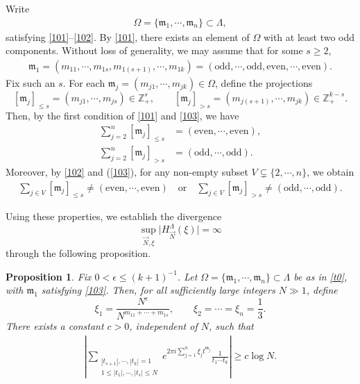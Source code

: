 \documentclass[11 pt,letterpaper]{amsart}
\theoremstyle{plain}
\newtheorem{proposition}{Proposition}\numberwithin{proposition}{section}
\theoremstyle{definition}
\theoremstyle{remark} \theoremstyle{exam} \theoremstyle{ob}
\numberwithin{equation}{section}
\begin{document}
Write
\begin{align}\label{t0}
\Omega=\{\mathfrak{m}_1,\cdots,\mathfrak{m}_n\}\subset \Lambda,
\end{align}
satisfying \eqref{101}--\eqref{102}. By \eqref{101}, there exists an element of  $ \Omega$ with at least two odd components. Without loss of generality, we may assume that for some $s\ge 2$,
\begin{align}\label{103}
\mathfrak{m}_1=(m_{11},\cdots,m_{1s},m_{1(s+1)},\cdots,m_{1k})
=(\text{odd},\cdots,\text{odd},\text{even},\cdots,\text{even}).
\end{align}
Fix such an $s$.
For each $\mathfrak{m}_j=(m_{j1},\cdots,m_{jk})\in \Omega$, define the projections
\[
[\mathfrak{m}_j]_{\le s}=(m_{j1},\cdots,m_{js})\in \mathbb{Z}_+^s,
\qquad
[\mathfrak{m}_j]_{>s}=(m_{j(s+1)},\cdots,m_{jk})\in \mathbb{Z}_+^{k-s}.
\]
Then, by the first condition of \eqref{101} and \eqref{103}, we have
\begin{align}
\sum_{j=2}^n[\mathfrak{m}_j]_{\le s}&=(\text{even},\cdots,\text{even}),\label{104} \\
\sum_{j=2}^n[\mathfrak{m}_j]_{>s}&=(\text{odd},\cdots,\text{odd}).\label{1044}
\end{align}
Moreover, by   \eqref{102} and (\ref{103}),  for any non-empty subset $V\subsetneq \{2,\cdots,n\}$, we obtain
\begin{align}\label{105}
\sum_{j\in V } [\mathfrak{m}_j]_{\le s} \neq (\text{even},\cdots,\text{even})
\quad \text{or} \quad
\sum_{j\in V } [\mathfrak{m}_j]_{> s} \neq (\text{odd},\cdots,\text{odd}).
\end{align}

Using these properties, we establish the divergence
$$
\sup_{\vec N,\xi}\bigl|H_{\vec N}^{\Lambda}(\xi)\bigr|=\infty
$$
through the following proposition.


\begin{proposition}\label{h450}
 Fix  $0<\epsilon\le (k+1)^{-1}$. Let $\Omega=\{\mathfrak{m}_1,\cdots,\mathfrak{m}_n\}\subset \Lambda$ be as in \eqref{t0}, with $\mathfrak{m}_1$ satisfying \eqref{103}.  Then, for all sufficiently large integers $N\gg 1$, define
\[
\xi_1=\frac{N^{\epsilon}}{N^{m_{11}+\cdots+m_{1s}}},
\qquad
\xi_2=\cdots=\xi_n=\frac{1}{3}.
\]
There exists a constant $c>0$, independent of $N$, such that
\begin{align}\label{0487}
\left|\sum_{\substack{|t_{s+1}|,\cdots,|t_k|=1 \\ 1\le |t_1|,\cdots,|t_s|\le N}}
e^{2\pi i \sum_{j=1}^n \xi_j t^{\mathfrak{m}_j}}
\frac{1}{t_1\cdots t_k}\right|
\ge c\log N.
\end{align}
\end{proposition}
\end{document}
